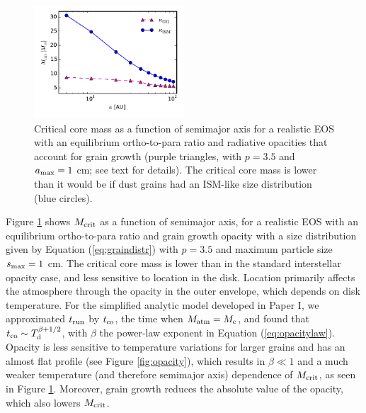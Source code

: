 \begin{figure}[htb]
\centering
\includegraphics[width=0.5\textwidth]{figures/Mcrit_vs_a_gg.pdf}
\caption{Critical core mass as a function of semimajor axis for a realistic EOS with an equilibrium ortho-to-para ratio and radiative opacities that account for grain growth (purple triangles, with $p=3.5$ and $a_{\rm max}=1$ cm; see text for details). The critical core mass is lower than it would be if dust grains had an ISM-like size distribution (blue circles).}
\label{fig:Mcritvsagg}
\end{figure}

Figure \ref{fig:Mcritvsagg} shows $M_{\rm crit}$ as a function of semimajor axis, for a realistic EOS with an equilibrium ortho-to-para ratio and grain growth opacity with a size distribution given by Equation (\ref{eq:graindistr}) with $p=3.5$ and maximum particle size $s_{\rm max}=1$ cm. The critical core mass is lower than in the standard interstellar opacity case, and less sensitive to location in the disk. Location primarily affects the atmosphere through the opacity in the outer envelope, which depends on disk temperature. For the simplified analytic model developed in Paper I, we approximated $t_{\rm run}$ by  $t_{\rm co}$, the time when $M_{\rm atm}=M_{\rm c}$, and found that $t_{\rm co} \sim T_{\rm d}^{\beta+1/2}$, with $\beta$ the power-law exponent in Equation (\ref{eq:opacitylaw}). Opacity is less sensitive to temperature variations for larger grains and has an almost flat profile (see Figure \ref{fig:opacity}), which results in $\beta \ll 1$ and a much weaker temperature (and therefore semimajor axis) dependence of $M_{\rm crit}$, as seen in Figure \ref{fig:Mcritvsagg}. Moreover, grain growth reduces the absolute value of the opacity, which also lowers $M_{\rm crit}$. %

